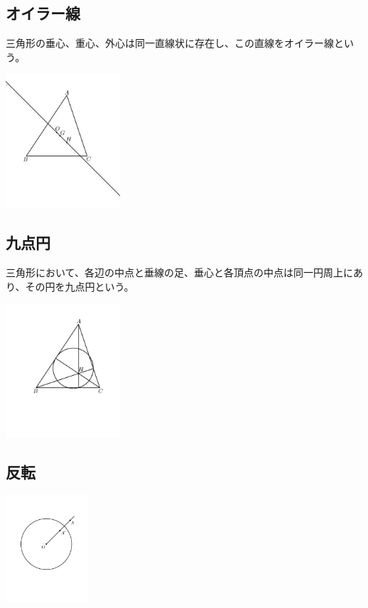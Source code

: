 \documentclass[uplatex,fleqn]{jsbook}
\begin{document}
\subsection{オイラー線}
三角形の垂心、重心、外心は同一直線状に存在し、この直線をオイラー線という。

\includegraphics[clip,height=5cm]{figures/Euler.pdf}

\subsection{九点円}
三角形において、各辺の中点と垂線の足、垂心と各頂点の中点は同一円周上にあり、その円を九点円という。

\includegraphics[clip,height=5cm]{figures/Euler_circle.pdf}

\subsection{反転}
\includegraphics[clip,height=4cm]{figures/Hanten.pdf}
\end{document}
